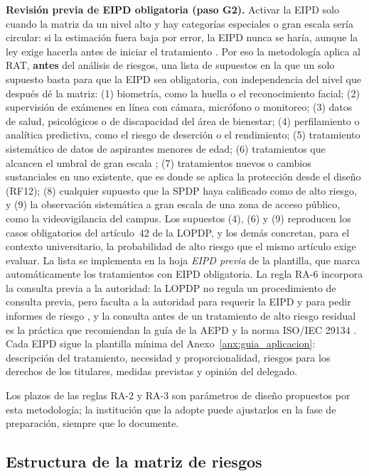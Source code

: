 \textbf{Revisión previa de EIPD obligatoria (paso G2).} Activar la EIPD solo cuando la matriz da un nivel alto y hay categorías especiales o gran escala sería circular: si la estimación fuera baja por error, la EIPD nunca se haría, aunque la ley exige hacerla antes de iniciar el tratamiento \cite[art.~42]{lopdp2021}. Por eso la metodología aplica al RAT, \textbf{antes} del análisis de riesgos, una lista de supuestos en la que un solo supuesto basta para que la EIPD sea obligatoria, con independencia del nivel que después dé la matriz: (1) biometría, como la huella o el reconocimiento facial; (2) supervisión de exámenes en línea con cámara, micrófono o monitoreo; (3) datos de salud, psicológicos o de discapacidad del área de bienestar; (4) perfilamiento o analítica predictiva, como el riesgo de deserción o el rendimiento; (5) tratamiento sistemático de datos de aspirantes menores de edad; (6) tratamientos que alcancen el umbral de gran escala \cite{spdp2026granescala}; (7) tratamientos nuevos o cambios sustanciales en uno existente, que es donde se aplica la protección desde el diseño (RF12); (8) cualquier supuesto que la SPDP haya calificado como de alto riesgo, y (9) la observación sistemática a gran escala de una zona de acceso público, como la videovigilancia del campus. Los supuestos (4), (6) y (9) reproducen los casos obligatorios del artículo~42 de la LOPDP, y los demás concretan, para el contexto universitario, la probabilidad de alto riesgo que el mismo artículo exige evaluar. La lista se implementa en la hoja \textit{EIPD previa} de la plantilla, que marca automáticamente los tratamientos con EIPD obligatoria. La regla RA-6 incorpora la consulta previa a la autoridad: la LOPDP no regula un procedimiento de consulta previa, pero faculta a la autoridad para requerir la EIPD y para pedir informes de riesgo \cite[arts.~9, lit.~c, y 42]{lopdp2021}, y la consulta antes de un tratamiento de alto riesgo residual es la práctica que recomiendan la guía de la AEPD y la norma ISO/IEC 29134 \cite{aepd2021riesgo,iso29134_2023}. Cada EIPD sigue la plantilla mínima del Anexo~\ref{anx:guia_aplicacion}: descripción del tratamiento, necesidad y proporcionalidad, riesgos para los derechos de los titulares, medidas previstas y opinión del delegado.

Los plazos de las reglas RA-2 y RA-3 son parámetros de diseño propuestos por esta metodología; la institución que la adopte puede ajustarlos en la fase de preparación, siempre que lo documente.

\subsection{Estructura de la matriz de riesgos}

